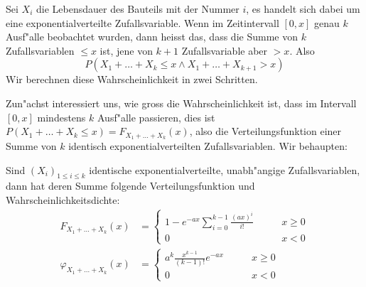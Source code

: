 Sei $X_i$ die Lebensdauer des Bauteils mit der Nummer $i$, es handelt
sich dabei um eine exponentialverteilte Zufallsvariable. Wenn im Zeitintervall
$[0,x]$ genau $k$ Ausf"alle beobachtet wurden, dann heisst das, dass die
Summe von $k$ Zufallsvariablen $\le x$ ist, jene von $k+1$ Zufallsvariable
aber $>x$. Also
\[
P(X_1+\dots+X_k\le x \wedge X_1+\dots+X_{k+1}>x)
\]
Wir berechnen diese Wahrscheinlichkeit in zwei Schritten.

Zun"achst interessiert uns, wie gross die Wahrscheinlichkeit ist, dass im
Intervall $[0,x]$ mindestens $k$ Ausf"alle passieren, dies ist
$P(X_1+\dots+X_k\le x)=F_{X_1+\dots+X_k}(x)$, also die Verteilungsfunktion
einer Summe von $k$ identisch exponentialverteilten Zufallsvariablen. Wir
behaupten:
\begin{satz}Sind $(X_i)_{1\le i\le k}$ identische exponentialverteilte,
unabh"angige Zufallsvariablen, dann hat deren Summe folgende Verteilungsfunktion
und Wahrscheinlichkeitsdichte:
\begin{align*}
F_{X_1+\dots+X_k}(x)&=\begin{cases}
{\displaystyle 1-e^{-ax}\sum_{i=0}^{k-1}\frac{(ax)^i}{i!}}&\qquad x \ge 0\\
0&\qquad x < 0
\end{cases}
\\
\varphi_{X_1+\dots+X_k}(x)&=\begin{cases}
{\displaystyle a^k\frac{x^{k-1}}{(k-1)!}e^{-ax}}&\qquad x\ge0\\
0&\qquad x < 0\end{cases}
\end{align*}
\end{satz}

